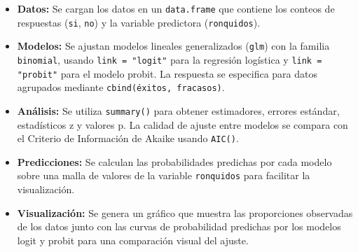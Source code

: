 \begin{itemize}
    \item \textbf{Datos:} Se cargan los datos en un \texttt{data.frame} que contiene los conteos de respuestas (\texttt{si}, \texttt{no}) y la variable predictora (\texttt{ronquidos}).

    \item \textbf{Modelos:} Se ajustan modelos lineales generalizados (\texttt{glm}) con la familia \texttt{binomial}, usando \texttt{link = "logit"} para la regresión logística y \texttt{link = "probit"} para el modelo probit. La respuesta se especifica para datos agrupados mediante \texttt{cbind(éxitos, fracasos)}.

    \item \textbf{Análisis:} Se utiliza \texttt{summary()} para obtener estimadores, errores estándar, estadísticos z y valores p. La calidad de ajuste entre modelos se compara con el Criterio de Información de Akaike usando \texttt{AIC()}.

    \item \textbf{Predicciones:} Se calculan las probabilidades predichas por cada modelo sobre una malla de valores de la variable \texttt{ronquidos} para facilitar la visualización.

    \item \textbf{Visualización:} Se genera un gráfico que muestra las proporciones observadas de los datos junto con las curvas de probabilidad predichas por los modelos logit y probit para una comparación visual del ajuste.
\end{itemize}



\clearpage




















